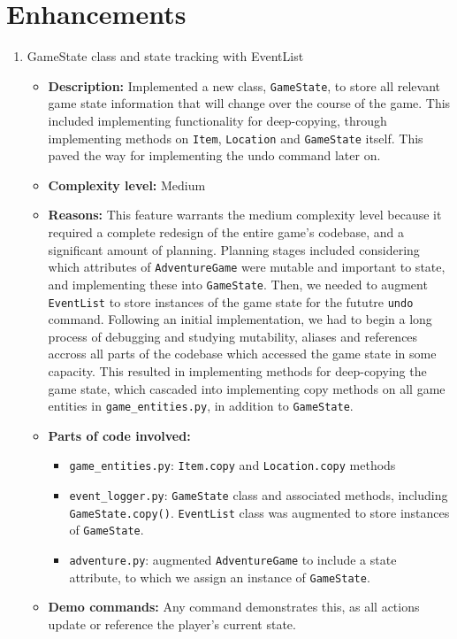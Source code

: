\documentclass[11pt]{article}
\begin{document}
\section*{Enhancements}

\begin{enumerate}

    \item GameState class and state tracking with EventList
    \begin{itemize}
       \item \textbf{Description:} Implemented a new class, \verb|GameState|, to store all relevant game state information that will change over the course of the game. This included implementing functionality for deep-copying, through implementing methods on \verb|Item|, \verb|Location| and \verb|GameState| itself. This paved the way for implementing the undo command later on.
       \item \textbf{Complexity level:} Medium
       \item \textbf{Reasons:} This feature warrants the medium complexity level because it required a complete redesign of the entire game's codebase, and a significant amount of planning. Planning stages included considering which attributes of \verb|AdventureGame| were mutable and important to state, and implementing these into \verb|GameState|. Then, we needed to augment \verb|EventList| to store instances of the game state for the fututre \verb|undo| command. Following an initial implementation, we had to begin a long process of debugging and studying mutability, aliases and references accross all parts of the codebase which accessed the game state in some capacity. This resulted in implementing methods for deep-copying the game state, which cascaded into implementing copy methods on all game entities in \verb|game_entities.py|, in addition to \verb|GameState|.
       \item \textbf{Parts of code involved:}
       \begin{itemize}
        \item \verb|game_entities.py|: \verb|Item.copy| and \verb|Location.copy| methods
        \item \verb|event_logger.py|: \verb|GameState| class and associated methods, including \verb|GameState.copy()|. \verb|EventList| class was augmented to store instances of \verb|GameState|.
        \item \verb|adventure.py|: augmented \verb|AdventureGame| to include a state attribute, to which we assign an instance of \verb|GameState|.
       \end{itemize}
       \item \textbf{Demo commands:} Any command demonstrates this, as all actions update or reference the player's current state.
    \end{itemize}


\end{enumerate}
\end{document}
